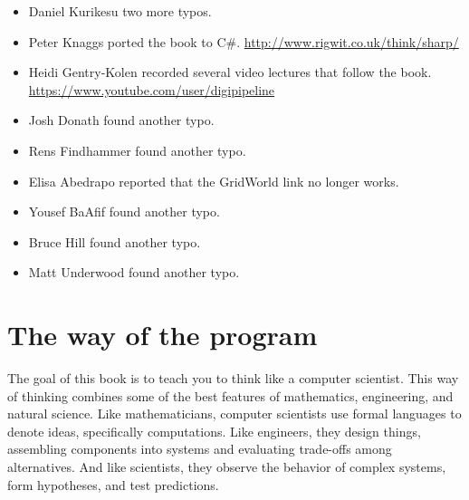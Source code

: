 \documentclass[12pt]{book}
\theoremstyle{exercise}
\begin{document}
\begin{itemize}
\item Daniel Kurikesu two more typos.

\item Peter Knaggs ported the book to C\#.
\url{http://www.rigwit.co.uk/think/sharp/}

\item Heidi Gentry-Kolen recorded several video lectures that follow the book.
\url{https://www.youtube.com/user/digipipeline}

\item Josh Donath found another typo.

\item Rens Findhammer found another typo.

\item Elisa Abedrapo reported that the GridWorld link no longer works.

\item Yousef BaAfif found another typo.

\item Bruce Hill found another typo.

\item Matt Underwood found another typo.

\end{itemize}




\mainmatter


\chapter{The way of the program}
\label{theway}

The goal of this book is to teach you to think like a computer scientist.
This way of thinking combines some of the best features of mathematics, engineering, and natural science.
Like mathematicians, computer scientists use formal languages to denote ideas, specifically computations.
Like engineers, they design things, assembling components into systems and evaluating trade-offs among alternatives.
And like scientists, they observe the behavior of complex systems, form hypotheses, and test predictions.
\end{document}
